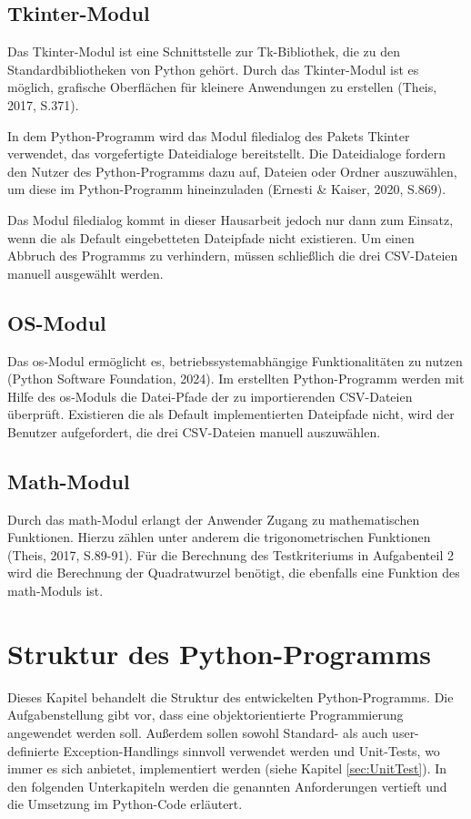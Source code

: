 \documentclass[
    a4paper, 								%
    oneside, 								%
    11pt, 									%
    listof=totoc, 					%
    bibliography=totoc, 		%
    final, 									%
    numbers=noenddot
]{scrreprt}
\begin{document}
\section{Tkinter-Modul}
Das Tkinter-Modul ist eine Schnittstelle zur Tk-Bibliothek, die zu den Standardbibliotheken von Python gehört. Durch das Tkinter-Modul ist es möglich, grafische Oberflächen für kleinere Anwendungen zu erstellen (Theis, 2017, S.371). 

In dem Python-Programm wird das Modul filedialog des Pakets Tkinter verwendet, das vorgefertigte Dateidialoge bereitstellt. Die Dateidialoge fordern den Nutzer des Python-Programms dazu auf, Dateien oder Ordner auszuwählen, um diese im Python-Programm hineinzuladen (Ernesti \& Kaiser, 2020, S.869).

Das Modul filedialog kommt in dieser Hausarbeit jedoch nur dann zum Einsatz, wenn die als Default eingebetteten Dateipfade nicht existieren. Um einen Abbruch des Programms zu verhindern, müssen schließlich die drei CSV-Dateien manuell ausgewählt werden. 


\section{OS-Modul}
Das os-Modul ermöglicht es, betriebssystemabhängige Funktionalitäten zu nutzen (Python Software Foundation, 2024). Im erstellten Python-Programm werden mit Hilfe des os-Moduls die Datei-Pfade der zu importierenden CSV-Dateien überprüft. Existieren die als Default implementierten Dateipfade nicht, wird der Benutzer aufgefordert, die drei CSV-Dateien manuell auszuwählen. 

\section{Math-Modul}
Durch das math-Modul erlangt der Anwender Zugang zu mathematischen Funktionen. Hierzu zählen unter anderem die trigonometrischen Funktionen (Theis, 2017, S.89-91). Für die Berechnung des Testkriteriums in Aufgabenteil 2 wird die Berechnung der Quadratwurzel benötigt, die ebenfalls eine Funktion des math-Moduls ist. \\
\chapter{Struktur des Python-Programms}
Dieses Kapitel behandelt die Struktur des entwickelten Python-Programms. Die Aufgabenstellung gibt vor, dass eine objektorientierte Programmierung angewendet werden soll. Außerdem sollen sowohl Standard- als auch user-definierte Exception-Handlings sinnvoll verwendet werden und Unit-Tests, wo immer es sich anbietet, implementiert werden (siehe Kapitel \ref{sec:UnitTest}). In den folgenden Unterkapiteln werden die genannten Anforderungen vertieft und die Umsetzung im Python-Code erläutert. 
\end{document}
